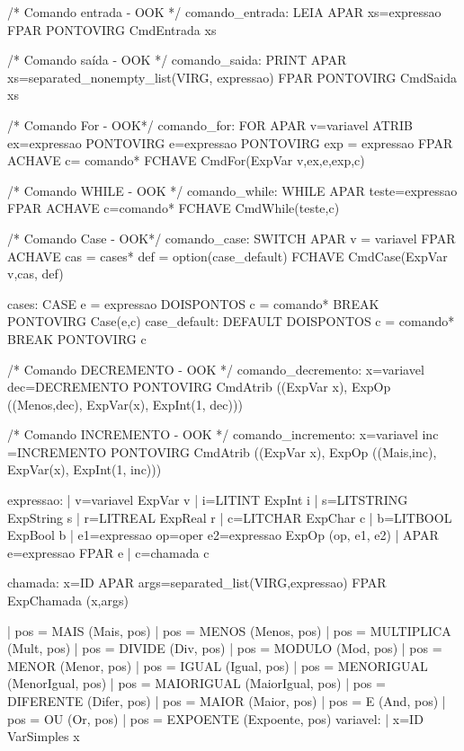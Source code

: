 \documentclass[12pt,a4paper,twoside]{article}
\begin{document}
\begin{terminal}
/* Comando entrada 							- OOK */
comando_entrada: LEIA APAR xs=expressao FPAR PONTOVIRG {CmdEntrada xs}

/* Comando saída 							- OOK */
comando_saida: PRINT APAR xs=separated_nonempty_list(VIRG, expressao) FPAR PONTOVIRG { CmdSaida xs }

/* Comando For								- OOK*/
comando_for: FOR APAR v=variavel ATRIB ex=expressao PONTOVIRG e=expressao PONTOVIRG exp = expressao FPAR ACHAVE
							c= comando* 
						FCHAVE { CmdFor(ExpVar v,ex,e,exp,c) }

/* Comando WHILE 							- OOK */
comando_while: WHILE APAR teste=expressao FPAR ACHAVE c=comando* FCHAVE {CmdWhile(teste,c)}

/* Comando Case								- OOK*/
comando_case: SWITCH APAR v = variavel FPAR ACHAVE 
				cas = cases* 
				def = option(case_default)
				FCHAVE {CmdCase(ExpVar v,cas, def)}

cases:  CASE e = expressao DOISPONTOS c = comando* BREAK PONTOVIRG 	{ Case(e,c) }
case_default: DEFAULT DOISPONTOS c = comando* BREAK PONTOVIRG 		{ c }

/* Comando DECREMENTO 						- OOK */
comando_decremento: x=variavel dec=DECREMENTO PONTOVIRG { 
	CmdAtrib ((ExpVar x),
	ExpOp ((Menos,dec), ExpVar(x), ExpInt(1,  dec)))
	}

/* Comando INCREMENTO 						- OOK */
comando_incremento: x=variavel inc =INCREMENTO PONTOVIRG { 
	CmdAtrib ((ExpVar x),
	ExpOp ((Mais,inc), ExpVar(x), ExpInt(1,  inc)))
	}

expressao:
			| v=variavel 						{ ExpVar v				}
			| i=LITINT							{ ExpInt i				}
			| s=LITSTRING 						{ ExpString s 			}
			| r=LITREAL							{ ExpReal r				}
			| c=LITCHAR							{ ExpChar c 			}
			| b=LITBOOL							{ ExpBool b				}
			| e1=expressao op=oper e2=expressao { ExpOp (op, e1, e2) 	}
			| APAR e=expressao FPAR 			{ e 					}
			| c=chamada					{ c						}
			
chamada: x=ID APAR args=separated_list(VIRG,expressao) FPAR { ExpChamada (x,args) }

			| pos = MAIS 		{ (Mais, pos) 		}
			| pos = MENOS 		{ (Menos, pos) 		}
			| pos = MULTIPLICA	{ (Mult, pos) 		}
			| pos = DIVIDE		{ (Div, pos)		}
			| pos = MODULO		{ (Mod, pos)		}
			| pos = MENOR 		{ (Menor, pos) 		}
			| pos = IGUAL 		{ (Igual, pos) 		}
			| pos = MENORIGUAL 	{ (MenorIgual, pos)	}
			| pos = MAIORIGUAL 	{ (MaiorIgual, pos)	}
			| pos = DIFERENTE 	{ (Difer, pos) 		}
			| pos = MAIOR 		{ (Maior, pos) 		}
			| pos = E 			{ (And, pos) 		}
			| pos = OU			{ (Or, pos) 		}
			| pos = EXPOENTE	{ (Expoente, pos)	}
variavel:
			| x=ID				{ VarSimples x }
\end{terminal}
\end{document}

